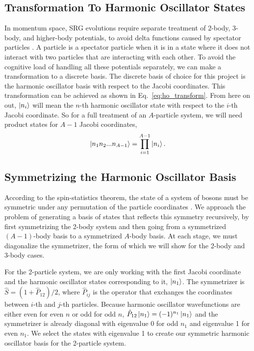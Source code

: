 \subsection{Transformation To Harmonic Oscillator States}

In momentum space, SRG evolutions require separate treatment of 2-body, 3-body, and higher-body potentials, to avoid delta functions caused by spectator particles \cite{glöckle1983quantum}. A particle is a spectator particle when it is in a state where it does not interact with two particles that are interacting with each other. To avoid the cognitive load of handling all these potentials separately, we can make a transformation to a discrete basis. The discrete basis of choice for this project is the harmonic oscillator basis with respect to the Jacobi coordinates. This transformation can be achieved as shown in Eq.~\ref{eq:ho_transform}. From here on out, $\ket{n_i}$ will mean the $n$-th harmonic oscillator state with respect to the $i$-th Jacobi coordinate. So for a full treatment of an $A$-particle system, we will need product states for $A-1$ Jacobi coordinates,
\begin{equation}
\ket{n_1 n_2 ... n_{A-1}} = \prod_{i=1}^{A-1}\ket{n_i}.
\end{equation}

\subsection{Symmetrizing the Harmonic Oscillator Basis}

According to the spin-statistics theorem, the state of a system of bosons must
be symmetric under any permutation of the particle coordinates
\cite{streater2000pct}.
We approach the problem of generating a basis of states that reflects this symmetry recursively, by first symmetrizing the 2-body system and then going from a symmetrized $(A-1)$-body basis to a symmetrized $A$-body basis. At each stage, we must diagonalize the symmetrizer, the form of which we will show for the 2-body and 3-body cases.

For the 2-particle system, we are only working with the first Jacobi coordinate and the harmonic oscillator states corresponding to it, $\ket{n_1}$. The symmetrizer is $\hat{S} = (1 + \hat{P}_{12})/2$, where $\hat{P}_{ij}$ is the operator that exchanges the coordinates between $i$-th and $j$-th particles. Because harmonic oscillator wavefunctions are either even for even $n$ or odd for odd $n$, $\hat{P}_{12} \ket{n_1} = (-1)^{n_1} \ket{n_1}$ and the symmetrizer is already diagonal with eigenvalue 0 for odd $n_1$ and eigenvalue 1 for even $n_1$. We select the states with eigenvalue 1 to create our symmetric harmonic oscillator basis for the 2-particle system.


